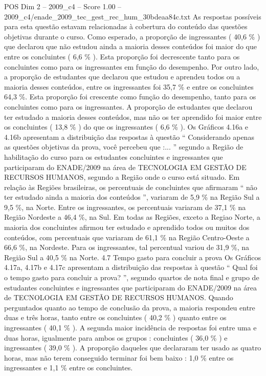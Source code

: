 \begin{textsample}{POS Dim 2 – 2009\_c4 – Score 1.00 – 2009\_c4/enade\_2009\_tec\_gest\_rec\_hum\_30bdeaa84c.txt}
As respostas possíveis para esta questão estavam relacionadas à cobertura do conteúdo das questões objetivas durante o curso.
Como esperado, a proporção de ingressantes ( 40,6 \% ) que declarou que não estudou ainda a maioria desses conteúdos foi maior do que entre os concluintes ( 6,6 \% ).
Esta proporção foi decrescente tanto para os concluintes como para os ingressantes em função do desempenho.
Por outro lado, a proporção de estudantes que declarou que estudou e aprendeu todos ou a maioria desses conteúdos, entre os ingressantes foi 35,7 \% e entre os concluintes 64,3 \%.
Esta proporção foi crescente como função do desempenho, tanto para os concluintes como para os ingressantes.
A proporção de estudantes que declarou ter estudado a maioria desses conteúdos, mas não os ter aprendido foi maior entre os concluintes ( 13,8 \% ) do que os ingressantes ( 6,6 \% ).
Os Gráficos 4.16a e 4.16b apresentam a distribuição das respostas à questão “ Considerando apenas as questões objetivas da prova, você percebeu que :... ” segundo a Região de habilitação do curso para os estudantes concluintes e ingressantes que participaram do ENADE/2009 na área de TECNOLOGIA EM GESTÃO DE RECURSOS HUMANOS, segundo a Região onde o curso está situado.
Em relação às Regiões brasileiras, os percentuais de concluintes que afirmaram “ não ter estudado ainda a maioria dos conteúdos ”, variaram de 5,9 \% na Região Sul a 9,5 \%, na Norte.
Entre os ingressantes, os percentuais variaram de 37,1 \% na Região Nordeste a 46,4 \%, na Sul.
Em todas as Regiões, exceto a Regiao Norte, a maioria dos concluintes afirmou ter estudado e aprendido todos ou muitos dos conteúdos, com percentuais que variaram de 61,1 \% na Região Centro-Oeste a 66,6 \%, na Nordeste.
Para os ingressantes, tal percentual variou de 31,9 \%, na Região Sul a 40,5 \% na Norte. 4.7 Tempo gasto para concluir a prova Os Gráficos 4.17a, 4.17b e 4.17c apresentam a distribuição das respostas à questão “ Qual foi o tempo gasto para concluir a prova? ”, segundo quartos de nota final e grupo de estudantes concluintes e ingressantes que participaram do ENADE/2009 na área de TECNOLOGIA EM GESTÃO DE RECURSOS HUMANOS.
Quando perguntados quanto ao tempo de conclusão da prova, a maioria respondeu entre duas e três horas, tanto entre os concluintes ( 40,2 \% ) quanto entre os ingressantes ( 40,1 \% ).
A segunda maior incidência de respostas foi entre uma e duas horas, igualmente para ambos os grupos : concluintes ( 36,0 \% ) e ingressantes ( 39,0 \% ).
A proporção daqueles que declararam ter usado as quatro horas, mas não terem conseguido terminar foi bem baixo : 1,0 \% entre os ingressantes e 1,1 \% entre os concluintes.

\end{textsample}
